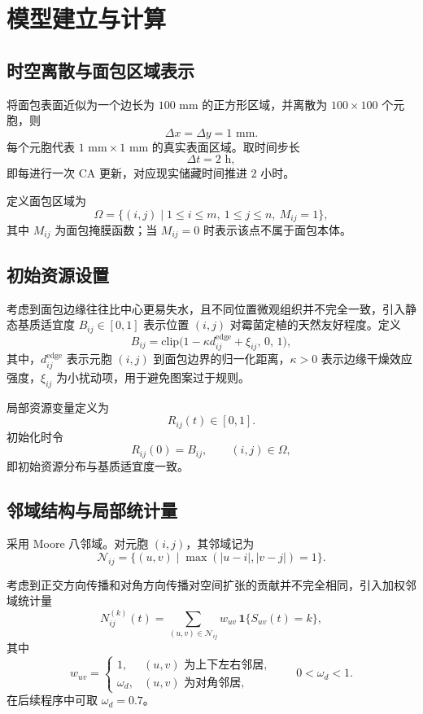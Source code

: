 \documentclass[12pt,a4paper]{ctexart}
\begin{document}
\section{模型建立与计算}

\subsection{时空离散与面包区域表示}

将面包表面近似为一个边长为 \(100\text{ mm}\) 的正方形区域，并离散为 \(100\times 100\) 个元胞，则
\[
\Delta x=\Delta y=1\text{ mm}.
\]
每个元胞代表 \(1\text{ mm}\times 1\text{ mm}\) 的真实表面区域。取时间步长
\[
\Delta t=2\text{ h},
\]
即每进行一次 CA 更新，对应现实储藏时间推进 \(2\) 小时。

定义面包区域为
\[
\Omega=\{(i,j)\mid 1\le i\le m,\ 1\le j\le n,\ M_{ij}=1\},
\]
其中 \(M_{ij}\) 为面包掩膜函数；当 \(M_{ij}=0\) 时表示该点不属于面包本体。

\subsection{初始资源设置}

考虑到面包边缘往往比中心更易失水，且不同位置微观组织并不完全一致，引入静态基质适宜度 \(B_{ij}\in[0,1]\) 表示位置 \((i,j)\) 对霉菌定植的天然友好程度。定义
\[
B_{ij}=\mathrm{clip}\bigl(1-\kappa d_{ij}^{\mathrm{edge}}+\xi_{ij},\,0,\,1\bigr),
\]
其中，\(d_{ij}^{\mathrm{edge}}\) 表示元胞 \((i,j)\) 到面包边界的归一化距离，\(\kappa>0\) 表示边缘干燥效应强度，\(\xi_{ij}\) 为小扰动项，用于避免图案过于规则。

局部资源变量定义为
\[
R_{ij}(t)\in[0,1].
\]
初始化时令
\[
R_{ij}(0)=B_{ij},\qquad (i,j)\in\Omega,
\]
即初始资源分布与基质适宜度一致。

\subsection{邻域结构与局部统计量}

采用 Moore 八邻域。对元胞 \((i,j)\)，其邻域记为
\[
\mathcal{N}_{ij}=\{(u,v)\mid \max(|u-i|,|v-j|)=1\}.
\]

考虑到正交方向传播和对角方向传播对空间扩张的贡献并不完全相同，引入加权邻域统计量
\[
N_{ij}^{(k)}(t)=\sum_{(u,v)\in\mathcal{N}_{ij}} w_{uv}\,\mathbf{1}\{S_{uv}(t)=k\},
\]
其中
\[
w_{uv}=
\begin{cases}
1, & (u,v)\text{ 为上下左右邻居},\\
\omega_d, & (u,v)\text{ 为对角邻居},
\end{cases}
\qquad 0<\omega_d<1.
\]
在后续程序中可取 \(\omega_d=0.7\)。
\end{document}
